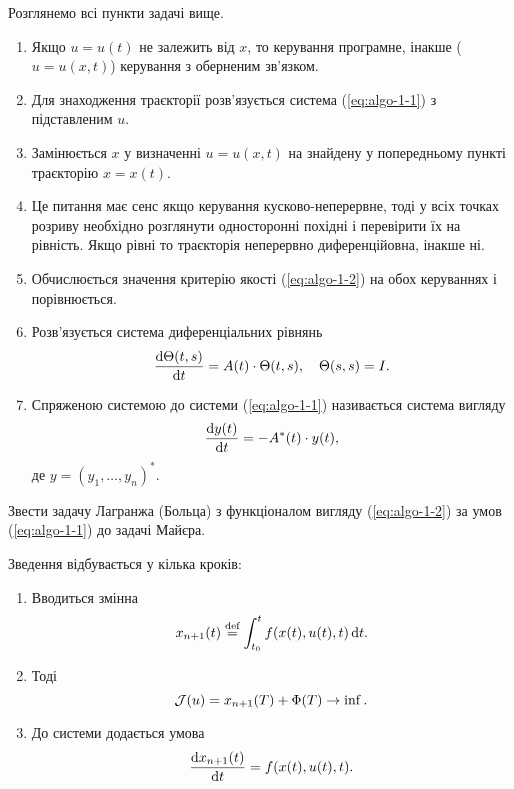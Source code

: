 \begin{algorithm}
	Розглянемо всі пункти задачі вище.
	\begin{enumerate}
		\item Якщо $u = u(t)$ не залежить від $x$, то керування програмне, інакше ($u = u(x, t)$) керування з оберненим зв'язком.
		\item Для знаходження траєкторії %
		розв'язується система (\ref{eq:algo-1-1}) з підставленим $u$.
		\item Замінюється $x$ у визначенні $u = u(x, t)$ на знайдену у попередньому пункті траєкторію $x = x(t)$.
		\item Це питання має сенс якщо керування кусково-неперервне, тоді у всіх точках розриву %
		необхідно розглянути односторонні похідні і перевірити їх на рівність. Якщо рівні то траєкторія неперервно диференційовна, інакше ні.
		\item Обчислюється значення критерію якості (\ref{eq:algo-1-2}) на обох керуваннях і порівнюється.
		\item Розв'язується система диференціальних рівнянь 
		\begin{equation}
		    \label{eq:algo-1-3}
		    \frac{\mathop{}\!\mathrm{d} \Theta(t, s)}{\mathop{}\!\mathrm{d} t} = A(t) \cdot \Theta(t, s), \quad \Theta(s, s) = I.
		\end{equation}
		\item Спряженою системою до системи (\ref{eq:algo-1-1}) називається система вигляду
		\begin{equation}
		    \label{eq:algo-1-4}
		    \frac{\mathop{}\!\mathrm{d} y(t)}{\mathop{}\!\mathrm{d} t} = - A^*(t) \cdot y(t),
		\end{equation}
		де $y = (y_1, \ldots, y_n)^*$.
	\end{enumerate}
\end{algorithm}

\begin{problem*}
	Звести задачу Лагранжа (Больца) з функціоналом вигляду (\ref{eq:algo-1-2}) за умов (\ref{eq:algo-1-1}) до задачі Майєра.
\end{problem*}

\begin{algorithm}
    \label{algo-1-2}
    Зведення відбувається у кілька кроків:
	\begin{enumerate}
		\item Вводиться змінна \[x_{n+1} (t) \overset{\text{def}}{=} \int_{t_0}^t f(x(t), u(t), t) \mathop{}\!\mathrm{d} t.\]
		\item Тоді \[ \mathcal{J}(u) = x_{n+1} (T) + \Phi(T) \to \inf. \]
		\item До системи додається умова \[ \frac{\mathop{}\!\mathrm{d} x_{n+1}(t)}{\mathop{}\!\mathrm{d} t} = f(x(t), u(t), t). \]
	\end{enumerate}
\end{algorithm}
